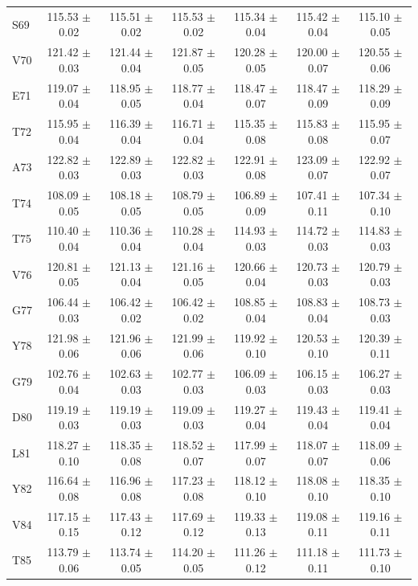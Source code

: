 \documentclass[%
 aip,
 amsmath,amssymb,
 preprint,%
]{revtex4-1}
\begin{document}
\begin{center}
\begin{longtable}{l|c|c|c|c|c|c}
S69 & 115.53 $\pm$ 0.02 & 115.51 $\pm$ 0.02 & 115.53 $\pm$ 0.02 & 115.34 $\pm$ 0.04 & 115.42 $\pm$ 0.04 & 115.10 $\pm$ 0.05 \\
V70 & 121.42 $\pm$ 0.03 & 121.44 $\pm$ 0.04 & 121.87 $\pm$ 0.05 & 120.28 $\pm$ 0.05 & 120.00 $\pm$ 0.07 & 120.55 $\pm$ 0.06 \\
E71 & 119.07 $\pm$ 0.04 & 118.95 $\pm$ 0.05 & 118.77 $\pm$ 0.04 & 118.47 $\pm$ 0.07 & 118.47 $\pm$ 0.09 & 118.29 $\pm$ 0.09 \\
T72 & 115.95 $\pm$ 0.04 & 116.39 $\pm$ 0.04 & 116.71 $\pm$ 0.04 & 115.35 $\pm$ 0.08 & 115.83 $\pm$ 0.08 & 115.95 $\pm$ 0.07 \\
A73 & 122.82 $\pm$ 0.03 & 122.89 $\pm$ 0.03 & 122.82 $\pm$ 0.03 & 122.91 $\pm$ 0.08 & 123.09 $\pm$ 0.07 & 122.92 $\pm$ 0.07 \\
T74 & 108.09 $\pm$ 0.05 & 108.18 $\pm$ 0.05 & 108.79 $\pm$ 0.05 & 106.89 $\pm$ 0.09 & 107.41 $\pm$ 0.11 & 107.34 $\pm$ 0.10 \\
T75 & 110.40 $\pm$ 0.04 & 110.36 $\pm$ 0.04 & 110.28 $\pm$ 0.04 & 114.93 $\pm$ 0.03 & 114.72 $\pm$ 0.03 & 114.83 $\pm$ 0.03 \\
V76 & 120.81 $\pm$ 0.05 & 121.13 $\pm$ 0.04 & 121.16 $\pm$ 0.05 & 120.66 $\pm$ 0.04 & 120.73 $\pm$ 0.03 & 120.79 $\pm$ 0.03 \\
G77 & 106.44 $\pm$ 0.03 & 106.42 $\pm$ 0.02 & 106.42 $\pm$ 0.02 & 108.85 $\pm$ 0.04 & 108.83 $\pm$ 0.04 & 108.73 $\pm$ 0.03 \\
Y78 & 121.98 $\pm$ 0.06 & 121.96 $\pm$ 0.06 & 121.99 $\pm$ 0.06 & 119.92 $\pm$ 0.10 & 120.53 $\pm$ 0.10 & 120.39 $\pm$ 0.11 \\
G79 & 102.76 $\pm$ 0.04 & 102.63 $\pm$ 0.03 & 102.77 $\pm$ 0.03 & 106.09 $\pm$ 0.03 & 106.15 $\pm$ 0.03 & 106.27 $\pm$ 0.03 \\
D80 & 119.19 $\pm$ 0.03 & 119.19 $\pm$ 0.03 & 119.09 $\pm$ 0.03 & 119.27 $\pm$ 0.04 & 119.43 $\pm$ 0.04 & 119.41 $\pm$ 0.04 \\
L81 & 118.27 $\pm$ 0.10 & 118.35 $\pm$ 0.08 & 118.52 $\pm$ 0.07 & 117.99 $\pm$ 0.07 & 118.07 $\pm$ 0.07 & 118.09 $\pm$ 0.06 \\
Y82 & 116.64 $\pm$ 0.08 & 116.96 $\pm$ 0.08 & 117.23 $\pm$ 0.08 & 118.12 $\pm$ 0.10 & 118.08 $\pm$ 0.10 & 118.35 $\pm$ 0.10 \\
V84 & 117.15 $\pm$ 0.15 & 117.43 $\pm$ 0.12 & 117.69 $\pm$ 0.12 & 119.33 $\pm$ 0.13 & 119.08 $\pm$ 0.11 & 119.16 $\pm$ 0.11 \\
T85 & 113.79 $\pm$ 0.06 & 113.74 $\pm$ 0.05 & 114.20 $\pm$ 0.05 & 111.26 $\pm$ 0.12 & 111.18 $\pm$ 0.11 & 111.73 $\pm$ 0.10 \\

\end{longtable}
\end{center}
\end{document}
